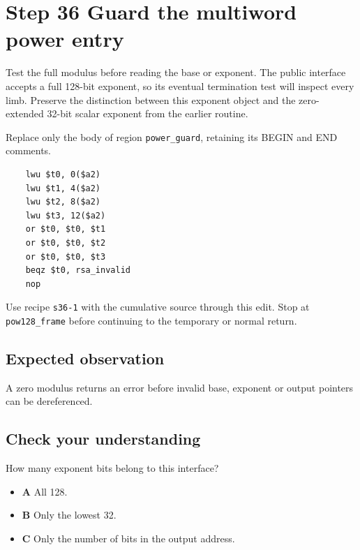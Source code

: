 \section{Step 36 Guard the multiword power entry}\label{rsa-s36}

Test the full modulus before reading the base or exponent. The public interface accepts a full 128-bit exponent, so its eventual termination test will inspect every limb. Preserve the distinction between this exponent object and the zero-extended 32-bit scalar exponent from the earlier routine.

Replace only the body of region \texttt{power\_guard}, retaining its BEGIN and END comments.

\begin{verbatim}
    lwu $t0, 0($a2)
    lwu $t1, 4($a2)
    lwu $t2, 8($a2)
    lwu $t3, 12($a2)
    or $t0, $t0, $t1
    or $t0, $t0, $t2
    or $t0, $t0, $t3
    beqz $t0, rsa_invalid
    nop
\end{verbatim}

Use recipe \texttt{s36-1} with the cumulative source through this edit. Stop at \texttt{pow128\_frame} before continuing to the temporary or normal return.

\subsection{Expected observation}
A zero modulus returns an error before invalid base, exponent or output pointers can be dereferenced.

\subsection{Check your understanding}
How many exponent bits belong to this interface?

\begin{itemize}
  \item \textbf{A} All 128.
  \item \textbf{B} Only the lowest 32.
  \item \textbf{C} Only the number of bits in the output address.
\end{itemize}
